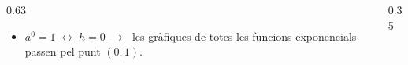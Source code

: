 \documentclass[aspectratio=169]{beamer}
\begin{document}
\begin{frame}[t]
  \vspace{0.14cm}
  \begin{columns}[T,onlytextwidth]
    \begin{column}{0.63\textwidth}
      \begin{minipage}[t][3em]{\columnwidth}
        \begin{itemize}
          \item<8-> \(a^0=1 \;\leftrightarrow\; h=0 \;\rightarrow\;\) les gràfiques de totes les funcions exponencials passen pel punt \((0,1)\).
        \end{itemize}
      \end{minipage}
    \end{column}
    \begin{column}{0.35\textwidth}
      \begin{minipage}[t][3em]{\columnwidth}{\strut}\end{minipage}
    \end{column}
  \end{columns}
\end{frame}
\end{document}

